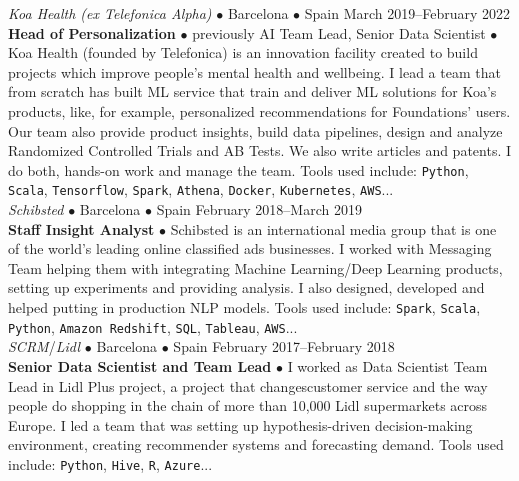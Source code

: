 \documentclass[a4paper, oneside]{scrreprt}
\begin{document}
\noindent\makebox[\linewidth]{\rule{\textwidth}{0.4pt}}
\vspace{0.1cm}
\noindent{}
\hspace{-0.2cm}\textit{Koa Health (ex Telefonica Alpha)} $\bullet$
Barcelona $\bullet$ Spain \hfill March 2019--February 2022\\
\noindent\textbf{\small Head of Personalization} $\bullet$ {previously
  AI Team Lead, Senior Data Scientist} $\bullet$ {\small Koa Health
  (founded by Telefonica) is an innovation facility created to build
  projects which improve people's mental health and wellbeing.  I lead
  a team that from scratch has built ML service that train and deliver
  ML solutions for Koa's products, like, for example, personalized
  recommendations for Foundations' users. Our team also provide product
  insights, build data pipelines, design and analyze Randomized Controlled Trials and AB
  Tests. We also write articles and patents. I do both, hands-on
  work and manage the team.  Tools used include: \texttt{Python},
  \texttt{Scala}, \texttt{Tensorflow}, \texttt{Spark},
  \texttt{Athena}, \texttt{Docker}, \texttt{Kubernetes},
  \texttt{AWS}... }\\

\vspace{-0.3cm}
\noindent{}
\hspace{-0.15cm}\textit{Schibsted} $\bullet$ 
Barcelona $\bullet$ Spain \hfill February 2018--March 2019\\
\noindent\textbf{\small Staff Insight Analyst } $\bullet$ 
{\small Schibsted is an international media group that is one of the world’s leading online
  classified ads businesses.  I worked with Messaging Team helping them with integrating Machine
  Learning/Deep Learning products, setting up experiments and providing analysis. I also designed,
  developed and helped putting in production NLP models. Tools used include: \texttt{Spark},
  \texttt{Scala}, \texttt{Python}, \texttt{Amazon Redshift}, \texttt{SQL}, \texttt{Tableau}, \texttt{AWS}... }\\

\vspace{-0.3cm}
\noindent{}\textit{SCRM}/\textit{Lidl} $\bullet$ 
Barcelona $\bullet$ Spain \hfill February 2017--February 2018\\
\noindent\textbf{\small Senior Data Scientist and Team Lead} $\bullet$ 
{\small I worked as Data Scientist Team Lead in Lidl Plus project, a project that changescustomer
  service and the way people do shopping in the chain of more than 10,000 Lidl supermarkets across
  Europe. I led a team that was setting up hypothesis-driven decision-making environment, creating
  recommender systems and forecasting demand. Tools used include: \texttt{Python}, \texttt{Hive},
  \texttt{R}, \texttt{Azure}...}\\
\end{document}
